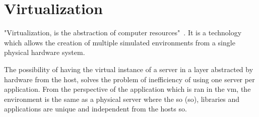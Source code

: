 





\section{Virtualization}
\label{s:virtualization}

"Virtualization, is the abstraction of computer resources"~\cite{virtualization-basics}. It is a technology which allows the creation of multiple simulated environments from a single physical hardware system. 

The possibility of having the virtual instance of a server in a layer abstracted by hardware from the host, solves the problem of inefficiency of using one server per application. From the perspective of the application which is ran in the \acrshort{vm}, the environment is the same as a physical server where the \acrlong{so} (\acrshort{so}), libraries and applications are unique and independent from the hosts \acrshort{so}. 

